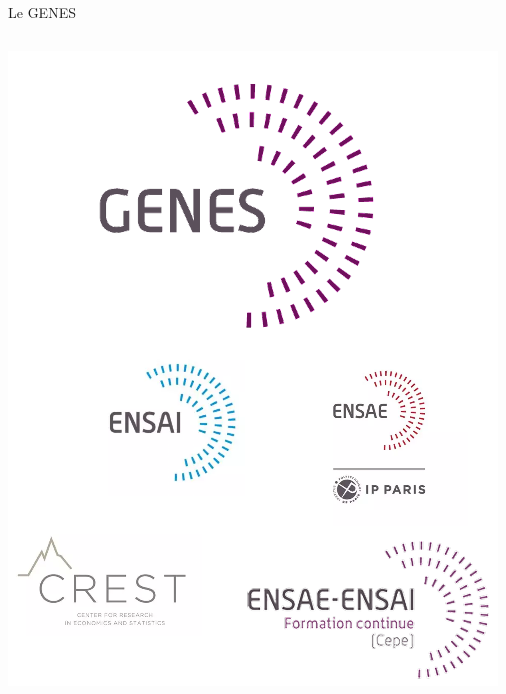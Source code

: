 \documentclass[
  12pt,
  ignorenonframetext,
  aspectratio=169,
  french,
  aspectratio=169]{beamer}
\begin{document}
\begin{frame}{Le GENES}
\begin{columns}[T]
\begin{column}{0.48\linewidth}
\includegraphics[width=\linewidth,height=0.5\textheight,keepaspectratio]{img/logos-genes-transparent.png}
\end{column}
\end{columns}
\end{frame}
\end{document}
